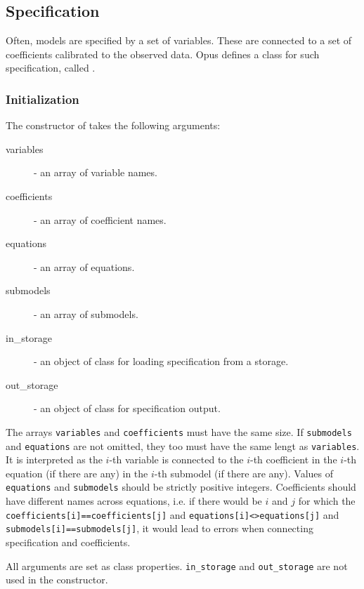 {\subsection{Specification}
%
\label{sec:specification}
Often, models are specified by a set of variables. \variablesindex These are connected to a
set of coefficients \coefficientsindex calibrated to the observed data. Opus defines a class for
such specification, called .

\subsubsection{Initialization}
The constructor of 
takes the following arguments:
\begin{description}
\item[variables] - an array of variable \variablesindex names.
\item[coefficients] - an array  of coefficient \coefficientsindex names.
\item[equations] - an array of equations.
\item[submodels] - an array of submodels.
\item[in_storage] - an object of class  for loading
  specification from a storage.
\item[out_storage] - an object of class  for specification output.
\end{description}
The arrays \verb|variables| \variablesindex and \verb|coefficients| \coefficientsindex must have the same size.
If \verb|submodels| and \verb|equations| are not omitted, they too must have
the same lengt as \verb|variables|. \variablesindex It is interpreted as the $i$-th variable \variablesindex
is connected to the $i$-th coefficient \coefficientsindex in the $i$-th equation (if there are
any) in the $i$-th submodel (if there are any). Values of \verb|equations| and
\verb|submodels| should be strictly positive integers. Coefficients \coefficientsindex should
have different names across equations, i.e. if there would be $i$ and $j$ for
which the \verb|coefficients[i]==coefficients[j]| \coefficientsindex and
\verb|equations[i]<>equations[j]| and \verb|submodels[i]==submodels[j]|, it
would lead to errors when connecting specification and coefficients. \coefficientsindex

All arguments are set as class properties. \verb|in_storage| and
\verb|out_storage| are not used in the constructor.

}
